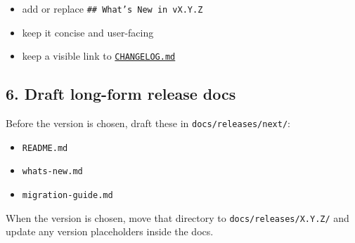 \begin{itemize}
\tightlist
\item
  add or replace \texttt{\#\allowbreak{}\#\allowbreak{} \allowbreak{}W\allowbreak{}h\allowbreak{}a\allowbreak{}t\allowbreak{}'\allowbreak{}s\allowbreak{} \allowbreak{}N\allowbreak{}e\allowbreak{}w\allowbreak{} \allowbreak{}i\allowbreak{}n\allowbreak{} \allowbreak{}v\allowbreak{}X\allowbreak{}.\allowbreak{}Y\allowbreak{}.\allowbreak{}Z}
\item
  keep it concise and user-facing
\item
  keep a visible link to \href{https://github.com/flyingrobots/bijou/blob/cbd70612140e7a450d764b3c7be1c6af878b99bc/docs/CHANGELOG.md}{\texttt{C\allowbreak{}H\allowbreak{}A\allowbreak{}N\allowbreak{}G\allowbreak{}E\allowbreak{}L\allowbreak{}O\allowbreak{}G\allowbreak{}.\allowbreak{}m\allowbreak{}d}}
\end{itemize}

\subsection{6. Draft long-form release docs}\label{record-274-draft-long-form-release-docs}

Before the version is chosen, draft these in \texttt{d\allowbreak{}o\allowbreak{}c\allowbreak{}s\allowbreak{}/\allowbreak{}r\allowbreak{}e\allowbreak{}l\allowbreak{}e\allowbreak{}a\allowbreak{}s\allowbreak{}e\allowbreak{}s\allowbreak{}/\allowbreak{}n\allowbreak{}e\allowbreak{}x\allowbreak{}t\allowbreak{}/}:

\begin{itemize}
\tightlist
\item
  \texttt{R\allowbreak{}E\allowbreak{}A\allowbreak{}D\allowbreak{}M\allowbreak{}E\allowbreak{}.\allowbreak{}m\allowbreak{}d}
\item
  \texttt{w\allowbreak{}h\allowbreak{}a\allowbreak{}t\allowbreak{}s\allowbreak{}-\allowbreak{}n\allowbreak{}e\allowbreak{}w\allowbreak{}.\allowbreak{}m\allowbreak{}d}
\item
  \texttt{m\allowbreak{}i\allowbreak{}g\allowbreak{}r\allowbreak{}a\allowbreak{}t\allowbreak{}i\allowbreak{}o\allowbreak{}n\allowbreak{}-\allowbreak{}g\allowbreak{}u\allowbreak{}i\allowbreak{}d\allowbreak{}e\allowbreak{}.\allowbreak{}m\allowbreak{}d}
\end{itemize}

When the version is chosen, move that directory to \texttt{d\allowbreak{}o\allowbreak{}c\allowbreak{}s\allowbreak{}/\allowbreak{}r\allowbreak{}e\allowbreak{}l\allowbreak{}e\allowbreak{}a\allowbreak{}s\allowbreak{}e\allowbreak{}s\allowbreak{}/\allowbreak{}X\allowbreak{}.\allowbreak{}Y\allowbreak{}.\allowbreak{}Z\allowbreak{}/} and update any version placeholders inside the docs.

